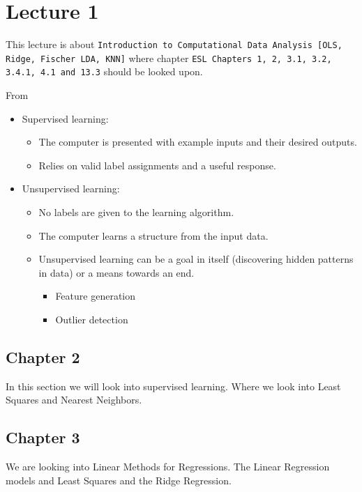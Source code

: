 \chapter{Lecture 1}


This lecture is about \texttt{Introduction to Computational Data Analysis [OLS, Ridge, Fischer LDA, KNN]} where chapter
\texttt{ESL Chapters 1, 2, 3.1, 3.2, 3.4.1, 4.1 and 13.3} should be looked upon.

From \cite[p.~15]{lecture1}
\begin{itemize}
  \item Supervised learning:
  \begin{itemize}
    \item The computer is presented with example inputs and their desired outputs.
    \item Relies on valid label assignments and a useful response.
  \end{itemize}
  \item Unsupervised learning:
  \begin{itemize}
    \item No labels are given to the learning algorithm.
    \item The computer learns a structure from the input data.
    \item Unsupervised learning can be a goal in itself (discovering hidden patterns in data) or a means towards an end.
        \begin{itemize}
          \item Feature generation
          \item Outlier detection
        \end{itemize}
  \end{itemize}
\end{itemize}




\section{Chapter 2}

In this section we will look into supervised learning. Where we look into Least Squares and Nearest Neighbors.

\section{Chapter 3}

We are looking into Linear Methods for Regressions. The Linear Regression models and Least Squares and the Ridge Regression.

